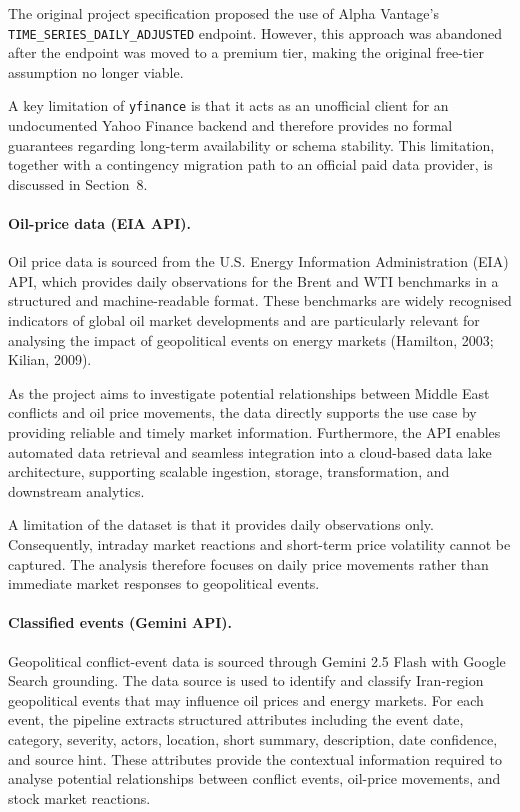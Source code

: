 \documentclass[11pt,a4paper]{article}
\begin{document}
The original project specification proposed the use of Alpha Vantage's
\texttt{TIME\_SERIES\_DAILY\_ADJUSTED} endpoint. However, this approach
was abandoned after the endpoint was moved to a premium tier,
making the original free-tier assumption no longer viable.

A key limitation of \texttt{yfinance} is that it acts as an unofficial
client for an undocumented Yahoo Finance backend and therefore provides
no formal guarantees regarding long-term availability or schema stability.
This limitation, together with a contingency migration path to an official
paid data provider, is discussed in Section~8.

\paragraph{Oil-price data (EIA API).}
Oil price data is sourced from the U.S. Energy Information Administration
(EIA) API, which provides daily observations for the Brent and WTI
benchmarks in a structured and machine-readable format. These benchmarks are widely recognised indicators of global oil market
developments and are particularly relevant for analysing the impact of
geopolitical events on energy markets (Hamilton, 2003; Kilian, 2009).

As the project aims to investigate potential relationships between Middle
East conflicts and oil price movements, the data directly supports the
use case by providing reliable and timely market information.
Furthermore, the API enables automated data retrieval and seamless
integration into a cloud-based data lake architecture, supporting
scalable ingestion, storage, transformation, and downstream analytics.

A limitation of the dataset is that it provides daily observations only.
Consequently, intraday market reactions and short-term price volatility
cannot be captured. The analysis therefore focuses on daily price
movements rather than immediate market responses to geopolitical events.

\paragraph{Classified events (Gemini API).}
Geopolitical conflict-event data is sourced through Gemini 2.5 Flash with
Google Search grounding. The data source is used to identify and classify
Iran-region geopolitical events that may influence oil prices and energy
markets. For each event, the pipeline extracts structured attributes
including the event date, category, severity, actors, location, short
summary, description, date confidence, and source hint. These attributes
provide the contextual information required to analyse potential
relationships between conflict events, oil-price movements, and stock
market reactions.
\end{document}
